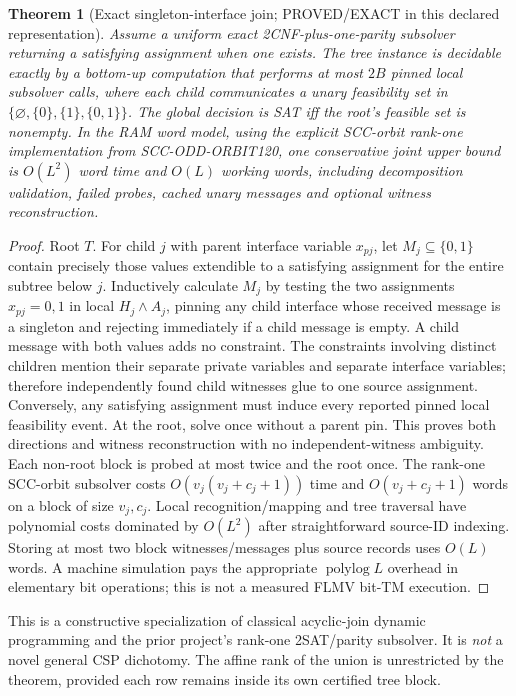 \documentclass[11pt]{article}
\newtheorem{theorem}{Theorem}
\begin{document}
\begin{theorem}[Exact singleton-interface join; PROVED/EXACT in this declared representation]
Assume a uniform exact 2CNF-plus-one-parity subsolver returning a satisfying assignment when one exists. The tree instance is decidable exactly by a bottom-up computation that performs at most $2B$ pinned local subsolver calls, where each child communicates a unary feasibility set in $\{\varnothing,\{0\},\{1\},\{0,1\}\}$. The global decision is SAT iff the root's feasible set is nonempty. In the RAM word model, using the explicit SCC-orbit rank-one implementation from SCC-ODD-ORBIT120, one conservative joint upper bound is $O(L^2)$ word time and $O(L)$ working words, including decomposition validation, failed probes, cached unary messages and optional witness reconstruction.
\end{theorem}
\begin{proof}
Root $T$. For child $j$ with parent interface variable $x_{pj}$, let $M_j\subseteq\{0,1\}$ contain precisely those values extendible to a satisfying assignment for the entire subtree below $j$. Inductively calculate $M_j$ by testing the two assignments $x_{pj}=0,1$ in local $H_j\land A_j$, pinning any child interface whose received message is a singleton and rejecting immediately if a child message is empty. A child message with both values adds no constraint. The constraints involving distinct children mention their separate private variables and separate interface variables; therefore independently found child witnesses glue to one source assignment. Conversely, any satisfying assignment must induce every reported pinned local feasibility event. At the root, solve once without a parent pin. This proves both directions and witness reconstruction with no independent-witness ambiguity. Each non-root block is probed at most twice and the root once. The rank-one SCC-orbit subsolver costs $O(v_j(v_j+c_j+1))$ time and $O(v_j+c_j+1)$ words on a block of size $v_j,c_j$. Local recognition/mapping and tree traversal have polynomial costs dominated by $O(L^2)$ after straightforward source-ID indexing. Storing at most two block witnesses/messages plus source records uses $O(L)$ words. A machine simulation pays the appropriate $\operatorname{polylog}L$ overhead in elementary bit operations; this is not a measured FLMV bit-TM execution.
\end{proof}
This is a constructive specialization of classical acyclic-join dynamic programming and the prior project's rank-one 2SAT/parity subsolver. It is \emph{not} a novel general CSP dichotomy. The affine rank of the union is unrestricted by the theorem, provided each row remains inside its own certified tree block.
\end{document}
